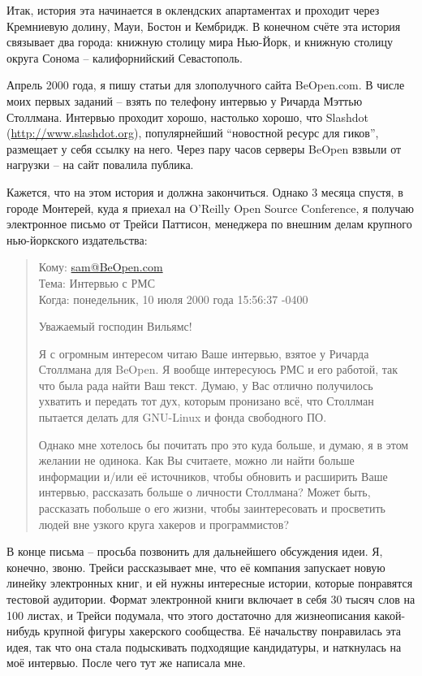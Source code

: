 Итак, история эта начинается в оклендских апартаментах и проходит через Кремниевую долину, Мауи, Бостон и Кембридж. В конечном счёте эта история связывает два города: книжную столицу мира Нью-Йорк, и книжную столицу округа Сонома -- калифорнийский Севастополь.

Апрель 2000 года, я пишу статьи для злополучного сайта BeOpen.com. В числе моих первых заданий -- взять по телефону интервью у Ричарда Мэттью Столлмана. Интервью проходит хорошо, настолько хорошо, что Slashdot (\url{http://www.slashdot.org}), популярнейший \enquote{новостной ресурс для гиков}, размещает у себя ссылку на него. Через пару часов серверы BeOpen взвыли от нагрузки -- на сайт повалила публика.

Кажется, что на этом история и должна закончиться. Однако 3 месяца спустя, в городе Монтерей, куда я приехал на O'Reilly Open Source Conference, я получаю электронное письмо от Трейси Паттисон, менеджера по внешним делам крупного нью-йоркского издательства:

\begin{quote}
Кому: \url{sam@BeOpen.com}\\Тема: Интервью с РМС\\Когда: понедельник, 10 июля 2000 года 15:56:37 -0400

Уважаемый господин Вильямс!

Я с огромным интересом читаю Ваше интервью, взятое у Ричарда Столлмана для BeOpen. Я вообще интересуюсь РМС и его работой, так что была рада найти Ваш текст. Думаю, у Вас отлично получилось ухватить и передать тот дух, которым пронизано всё, что Столлман пытается делать для GNU-Linux и фонда свободного ПО.

Однако мне хотелось бы почитать про это куда больше, и думаю, я в этом желании не одинока. Как Вы считаете, можно ли найти больше информации и/или её источников, чтобы обновить и расширить Ваше интервью, рассказать больше о личности Столлмана? Может быть, рассказать побольше о его жизни, чтобы заинтересовать и просветить людей вне узкого круга хакеров и программистов?
\end{quote}

В конце письма -- просьба позвонить для дальнейшего обсуждения идеи. Я, конечно, звоню. Трейси рассказывает мне, что её компания запускает новую линейку электронных книг, и ей нужны интересные истории, которые понравятся тестовой аудитории. Формат электронной книги включает в себя 30 тысяч слов на 100 листах, и Трейси подумала, что этого достаточно для жизнеописания какой-нибудь крупной фигуры хакерского сообщества. Её начальству понравилась эта идея, так что она стала подыскивать подходящие кандидатуры, и наткнулась на моё интервью. После чего тут же написала мне.

